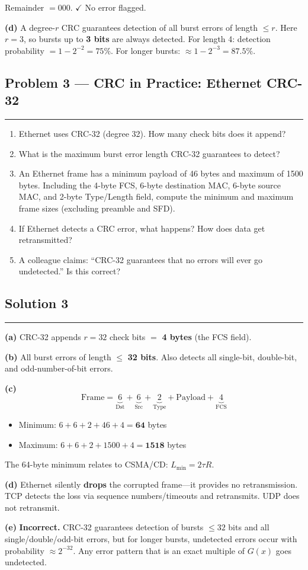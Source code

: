 \documentclass[12pt]{article}
\begin{document}
Remainder $= 000$. $\checkmark$ No error flagged.

\medskip
\textbf{(d)} A degree-$r$ CRC guarantees detection of all burst errors of length $\leq r$. Here $r = 3$, so bursts up to \textbf{3 bits} are always detected. For length 4: detection probability $= 1 - 2^{-2} = 75\%$. For longer bursts: $\approx 1 - 2^{-3} = 87.5\%$.
\bigskip

\bigskip

\subsection*{Problem 3 --- CRC in Practice: Ethernet CRC-32}
\hrule\medskip
\begin{enumerate}[label=(\alph*)]
  \item Ethernet uses CRC-32 (degree 32). How many check bits does it append?
  \item What is the maximum burst error length CRC-32 guarantees to detect?
  \item An Ethernet frame has a minimum payload of 46 bytes and maximum of 1500 bytes. Including the 4-byte FCS, 6-byte destination MAC, 6-byte source MAC, and 2-byte Type/Length field, compute the minimum and maximum frame sizes (excluding preamble and SFD).
  \item If Ethernet detects a CRC error, what happens? How does data get retransmitted?
  \item A colleague claims: ``CRC-32 guarantees that no errors will ever go undetected.'' Is this correct?
\end{enumerate}
\bigskip

\subsection*{Solution 3}
\hrule\medskip
\textbf{(a)} CRC-32 appends $r = 32$ check bits $=$ \textbf{4 bytes} (the FCS field).

\medskip
\textbf{(b)} All burst errors of length $\leq$ \textbf{32 bits}. Also detects all single-bit, double-bit, and odd-number-of-bit errors.

\medskip
\textbf{(c)}
\[
  \text{Frame} = \underbrace{6}_{\text{Dst}} + \underbrace{6}_{\text{Src}} + \underbrace{2}_{\text{Type}} + \text{Payload} + \underbrace{4}_{\text{FCS}}
\]
\begin{itemize}
  \item Minimum: $6 + 6 + 2 + 46 + 4 = \mathbf{64}$ bytes
  \item Maximum: $6 + 6 + 2 + 1500 + 4 = \mathbf{1518}$ bytes
\end{itemize}

The 64-byte minimum relates to CSMA/CD: $L_{\min} = 2\tau R$.

\medskip
\textbf{(d)} Ethernet silently \textbf{drops} the corrupted frame---it provides no retransmission. TCP detects the loss via sequence numbers/timeouts and retransmits. UDP does not retransmit.

\medskip
\textbf{(e)} \textbf{Incorrect.} CRC-32 guarantees detection of bursts $\leq 32$ bits and all single/double/odd-bit errors, but for longer bursts, undetected errors occur with probability $\approx 2^{-32}$. Any error pattern that is an exact multiple of $G(x)$ goes undetected.
\bigskip
\end{document}
